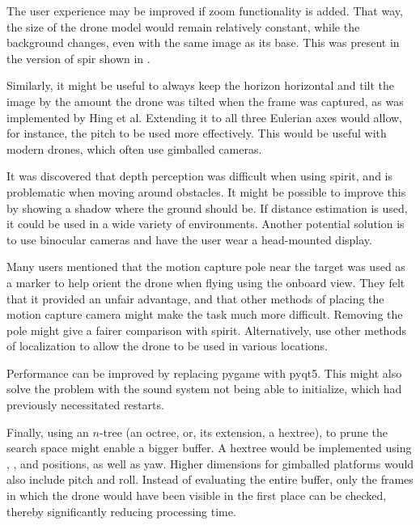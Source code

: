 The user experience may be improved if zoom functionality is added.
That way, the size of the drone model would remain relatively constant, while the background changes, even with the same image as its base.
This was present in the version of \gls{spir} shown in \cite{ito2008}.

Similarly, it might be useful to always keep the horizon horizontal and tilt the image by the amount the drone was tilted when the frame was captured, as was implemented by Hing et al.\cite{hing2009}
Extending it to all three Eulerian axes would allow, for instance, the pitch to be used more effectively.
This would be useful with modern drones, which often use gimballed cameras.

It was discovered that depth perception was difficult when using \gls{spirit}, and is problematic when moving around obstacles.
It might be possible to improve this by showing a shadow where the ground should be.
If distance estimation is used, it could be used in a wide variety of environments.
Another potential solution is to use binocular cameras and have the user wear a head-mounted display.

Many users mentioned that the motion capture pole near the target was used as a marker to help orient the drone when flying using the onboard view.
They felt that it provided an unfair advantage, and that other methods of placing the motion capture camera might make the task much more difficult.
Removing the pole might give a fairer comparison with \gls{spirit}.
Alternatively, use other methods of localization to allow the drone to be used in various locations.

Performance can be improved by replacing \gls{pygame} with \gls{pyqt5}.
This might also solve the problem with the sound system not being able to initialize, which had previously necessitated restarts.

Finally, using an $n$-tree (an octree, or, its extension, a hextree), to prune the search space might enable a bigger buffer.
A hextree would be implemented using , , and  positions, as well as yaw.
Higher dimensions for gimballed platforms would also include pitch and roll.
Instead of evaluating the entire buffer, only the frames in which the drone would have been visible in the first place can be checked, thereby significantly reducing processing time.
